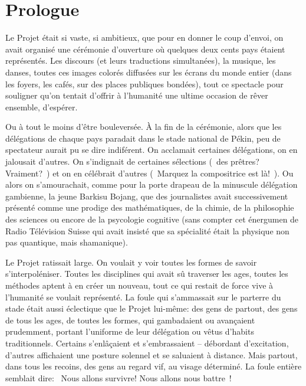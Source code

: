 \chapter*{Prologue}

Le Projet était si vaste, si ambitieux,
que pour en donner le coup d'envoi, on avait organisé une cérémonie d'ouverture
où quelques deux cents pays étaient représentés.  
%
Les discours (et leurs traductions simultanées), la musique, les danses, toutes
ces images colorés diffusées sur les écrans du monde entier (dans les foyers,
les cafés, sur des places publiques bondées), tout ce spectacle pour souligner
qu'on tentait d'offrir à l'humanité une ultime occasion de rêver
ensemble, d'espérer.

Ou à tout le moins d'être bouleversée.
%
À la fin de la cérémonie, alors que les délégations de chaque pays 
paradait dans le stade national de Pékin, peu de spectateur aurait pu se dire
indiférent.
%
On acclamait certaines délégations, on en jalousait d'autres.  
%
On s'indignait de certaines sélections (\og~des prêtres? Vraiment?~\fg)
et on en célébrait d'autres (\og~Marquez la compositrice est là!~\fg).
%
Ou alors on s'amourachait, comme pour la porte drapeau de la minuscule délégation
gambienne, la jeune Barkisu Bojang, que des journalistes avait successivement
présenté comme une prodige des mathématiques, de la chimie, de la philosophie
des sciences ou encore de la psycologie cognitive (sans compter cet énergumen de Radio
Télévision Suisse qui avait insisté que sa spécialité était la physique non pas
quantique, mais shamanique).

Le Projet ratissait large.  
%
On voulait y voir toutes les formes de savoir s'interpoléniser. 
%
Toutes les disciplines qui avait sû traverser les ages, toutes les méthodes
aptent à en créer un nouveau, tout ce qui restait de force vive à l'humanité se
voulait représenté.
%
La foule qui s'ammassait sur le parterre du stade était aussi éclectique que le
Projet lui-même: des gens de partout, des gens de tous les ages, de toutes les
formes, qui gambadaient ou avançaient prudemment, portant l'uniforme de leur
délégation ou vêtus d'habits traditionnels. 
%
Certains s'enlâçaient et s'embrassaient -- débordant d'excitation, d'autres
affichaient une posture solennel et se saluaient à distance.
%
Mais partout, dans tous les recoins, des gens au regard vif, au visage
déterminé.
%
La foule entière semblait dire: \og~Nous allons survivre!  Nous allons nous
battre~\fg!

